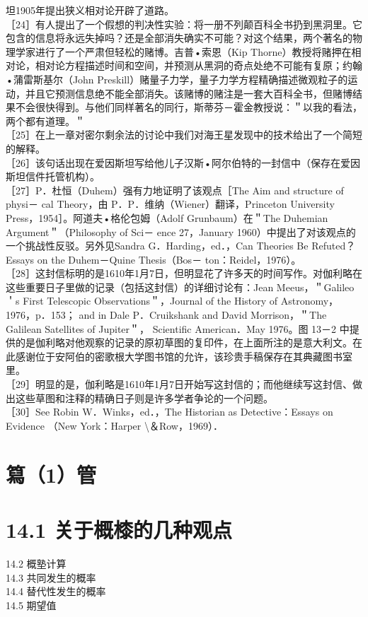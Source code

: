 坦1905年提出狭义相对论开辟了道路。\\
［24］有人提出了一个假想的判决性实验：将一册不列颠百科全书扔到黑洞里。它包含的信息将永远失掉吗？还是全部消失确实不可能？对这个结果，两个著名的物理学家进行了一个严肃但轻松的赌博。吉普•索恩（Kip Thorne）教授将赌押在相对论，相对论方程描述时间和空间，并预测从黑洞的奇点处绝不可能有复原；约翰•蒲雷斯基尔（John Preskill）赌量子力学，量子力学方程精确描述微观粒子的运动，并且它预测信息绝不能全部消失。该赌博的赌注是一套大百科全书，但赌博结果不会很快得到。与他们同样著名的同行，斯蒂芬－霍金教授说：＂以我的看法，两个都有道理。＂\\
［25］在上一章对密尔剩余法的讨论中我们对海王星发现中的技术给出了一个简短的解释。\\
［26］该句话出现在爱因斯坦写给他儿子汉斯•阿尔伯特的一封信中（保存在爱因斯坦信件托管机构）。\\
［27］P．杜恒（Duhem）强有力地证明了该观点［The Aim and structure of physi－ cal Theory，由 P．P．维纳（Wiener）翻译，Princeton University Press，1954］。阿道夫•格伦包姆（Adolf Grunbaum）在＂The Duhemian Argument＂（Philosophy of Sci－ ence 27，January 1960）中提出了对该观点的一个挑战性反驳。另外见Sandra G．Harding，ed．，Can Theories Be Refuted？Essays on the Duhem－Quine Thesis（Bos－ ton：Reidel，1976）。\\
［28］这封信标明的是1610年1月7日，但明显花了许多天的时间写作。对伽利略在这些重要日子里做的记录（包括这封信）的详细讨论有：Jean Meeus，＂Galileo＇s First Telescopic Observations＂，Journal of the History of Astronomy，1976，p．153； and in Dale P．Cruikshank and David Morrison，＂The Galilean Satellites of Jupiter＂， Scientific American．May 1976。图 13－2 中提供的是伽利略对他观察的记录的原初草图的复印件，在上面所注的是意大利文。在此感谢位于安阿伯的密歌根大学图书馆的允许，该珍贵手稿保存在其典藏图书室里。\\
［29］明显的是，伽利略是1610年1月7日开始写这封信的；而他继续写这封信、做出这些草图和注释的精确日子则是许多学者争论的一个问题。\\
［30］See Robin W．Winks，ed．，The Historian as Detective：Essays on Evidence （New York：Harper \textbackslash ＆Row，1969）．

\section*{䉣（1）管}
\section*{14.1 关于概㯃的几种观点}
14.2 概塾计算\\
14.3 共同发生的概率\\
14.4 替代性发生的概率\\
14.5 期望值

